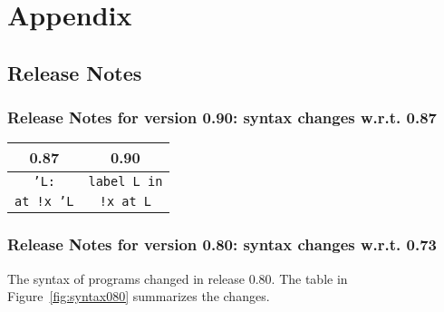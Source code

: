 \documentclass[a4paper,11pt,twoside,openright]{memoir}
\begin{document}








% 








\part{Appendix}

\appendix

\chapter{Release Notes}

\section{Release Notes for version 0.90: syntax changes w.r.t. 0.87}

\begin{center}
  \begin{tabular}{|c|c|}
\hline
    0.87 & 0.90 \\
\hline
\texttt{'L:} & \texttt{label L in} \\
\texttt{at !x 'L} & \texttt{!x at L} \\
\hline
  \end{tabular}
\end{center}

\section{Release Notes for version 0.80: syntax changes w.r.t. 0.73}

The syntax of \whyml programs changed in release 0.80.
The table in Figure~\ref{fig:syntax080} summarizes the changes.
\end{document}

